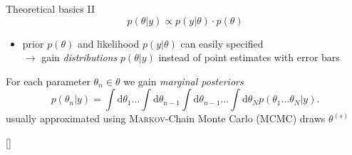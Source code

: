 \documentclass[11pt,aspectratio=169,dvipsnames]{beamer}
\newcommand{\thecolor}{black!70!blue}
\begin{document}
	\begin{frame}{Theoretical basics II}
		$$p(\theta|y)\propto p(y|\theta)\cdot p(\theta)$$
		\begin{itemize}
			\item prior $p(\theta)$ and likelihood $p(y|\theta)$ can easily specified \\
			$\to$ gain \emph{distributions} $p(\theta|y)$ instead of point estimates with error bars
		\end{itemize}
		\begin{tcolorbox}[colback=blue!5,colframe=\thecolor,title=\textsc{Bayesian} parameter inference]
			For each parameter $\theta_n\in\theta$ we gain \emph{marginal posteriors}
			\begin{equation*}
				\label{eq:marpost}
				p(\theta_n|y)=\int\text{d}\theta_1\dots\int\text{d}\theta_{n-1}\int\text{d}\theta_{n-1}\dots\int\text{d}\theta_Np(\theta_1\dots\theta_N|y).
			\end{equation*}
			usually approximated using \textsc{Markov}-Chain Monte Carlo (MCMC) draws $\theta^{(s)}$
			\begin{flushright}
				{\scriptsize[\cite{sivia}]}
			\end{flushright}
		\end{tcolorbox}
	\end{frame}
\end{document}
